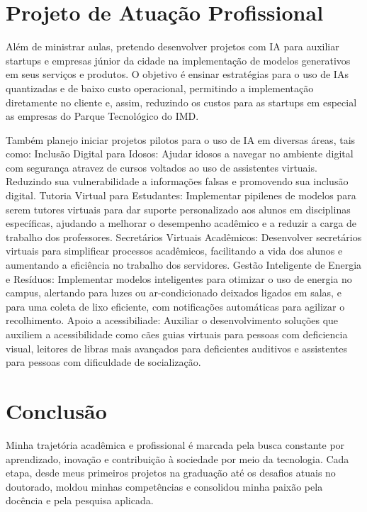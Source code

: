 \documentclass[10pt,a4paper,oneside]{book}
\begin{document}
\chapter{Projeto de Atuação Profissional}
\label{cap_proje}

Além de ministrar aulas, pretendo desenvolver projetos com IA para auxiliar startups e empresas júnior da cidade na
implementação de modelos generativos em seus serviços e produtos. O objetivo é ensinar estratégias para o uso de IAs
quantizadas e de baixo custo operacional, permitindo a implementação diretamente no cliente e, assim, reduzindo os
custos para as startups em especial as empresas do Parque Tecnológico do IMD.

Também planejo iniciar projetos pilotos para o uso de IA em diversas áreas, tais como:
Inclusão Digital para Idosos: Ajudar idosos a navegar no ambiente digital com segurança atravez de cursos voltados ao uso de assistentes virtuais. Reduzindo sua vulnerabilidade a informações falsas e promovendo sua inclusão digital.
Tutoria Virtual para Estudantes: Implementar pipilenes de modelos para serem tutores virtuais para dar suporte personalizado aos alunos em disciplinas específicas, ajudando a melhorar o desempenho acadêmico e a reduzir a carga de trabalho dos professores.
Secretários Virtuais Acadêmicos: Desenvolver secretários virtuais para simplificar processos acadêmicos, facilitando a vida dos alunos e aumentando a eficiência no trabalho dos servidores.
Gestão Inteligente de Energia e Resíduos: Implementar modelos inteligentes para otimizar o uso de energia no campus, alertando para luzes ou ar-condicionado deixados ligados em salas, e para uma coleta de lixo eficiente, com notificações automáticas para agilizar o recolhimento.
Apoio a acessibiliade: Auxiliar  o desenvolvimento soluções que auxiliem a acessibilidade como cães guias virtuais para pessoas com deficiencia visual, leitores de libras mais avançados para deficientes auditivos e assistentes para pessoas com dificuldade de socialização.


\chapter{Conclusão}
\label{cap_conclusao}

Minha trajetória acadêmica e profissional é marcada pela busca constante por aprendizado, inovação e contribuição à
sociedade por meio da tecnologia. Cada etapa, desde meus primeiros projetos na graduação até os desafios atuais no
doutorado, moldou minhas competências e consolidou minha paixão pela docência e pela pesquisa aplicada.
\end{document}
